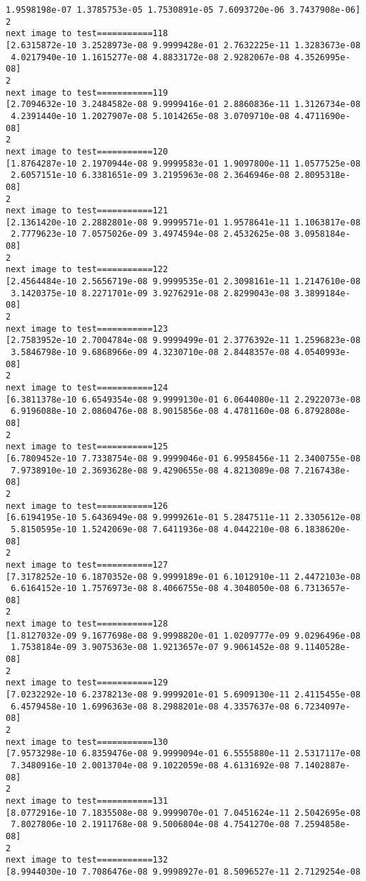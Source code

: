 \documentclass[11pt]{article}
\begin{document}
\begin{Verbatim}[commandchars=\\\{\}]
 1.9598198e-07 1.3785753e-05 1.7530891e-05 7.6093720e-06 3.7437908e-06]
2
next image to test===========118
[2.6315872e-10 3.2528973e-08 9.9999428e-01 2.7632225e-11 1.3283673e-08
 4.0217940e-10 1.1615277e-08 4.8833172e-08 2.9282067e-08 4.3526995e-08]
2
next image to test===========119
[2.7094632e-10 3.2484582e-08 9.9999416e-01 2.8860836e-11 1.3126734e-08
 4.2391440e-10 1.2027907e-08 5.1014265e-08 3.0709710e-08 4.4711690e-08]
2
next image to test===========120
[1.8764287e-10 2.1970944e-08 9.9999583e-01 1.9097800e-11 1.0577525e-08
 2.6057151e-10 6.3381651e-09 3.2195963e-08 2.3646946e-08 2.8095318e-08]
2
next image to test===========121
[2.1361420e-10 2.2882801e-08 9.9999571e-01 1.9578641e-11 1.1063817e-08
 2.7779623e-10 7.0575026e-09 3.4974594e-08 2.4532625e-08 3.0958184e-08]
2
next image to test===========122
[2.4564484e-10 2.5656719e-08 9.9999535e-01 2.3098161e-11 1.2147610e-08
 3.1420375e-10 8.2271701e-09 3.9276291e-08 2.8299043e-08 3.3899184e-08]
2
next image to test===========123
[2.7583952e-10 2.7004784e-08 9.9999499e-01 2.3776392e-11 1.2596823e-08
 3.5846798e-10 9.6868966e-09 4.3230710e-08 2.8448357e-08 4.0540993e-08]
2
next image to test===========124
[6.3811378e-10 6.6549354e-08 9.9999130e-01 6.0644080e-11 2.2922073e-08
 6.9196088e-10 2.0860476e-08 8.9015856e-08 4.4781160e-08 6.8792808e-08]
2
next image to test===========125
[6.7809452e-10 7.7338754e-08 9.9999046e-01 6.9958456e-11 2.3400755e-08
 7.9738910e-10 2.3693628e-08 9.4290655e-08 4.8213089e-08 7.2167438e-08]
2
next image to test===========126
[6.6194195e-10 5.6436949e-08 9.9999261e-01 5.2847511e-11 2.3305612e-08
 5.8150595e-10 1.5242069e-08 7.6411936e-08 4.0442210e-08 6.1838620e-08]
2
next image to test===========127
[7.3178252e-10 6.1870352e-08 9.9999189e-01 6.1012910e-11 2.4472103e-08
 6.6164152e-10 1.7576973e-08 8.4066755e-08 4.3048050e-08 6.7313657e-08]
2
next image to test===========128
[1.8127032e-09 9.1677698e-08 9.9998820e-01 1.0209777e-09 9.0296496e-08
 1.7538184e-09 3.9075363e-08 1.9213657e-07 9.9061452e-08 9.1140528e-08]
2
next image to test===========129
[7.0232292e-10 6.2378213e-08 9.9999201e-01 5.6909130e-11 2.4115455e-08
 6.4579458e-10 1.6996363e-08 8.2988201e-08 4.3357637e-08 6.7234097e-08]
2
next image to test===========130
[7.9573298e-10 6.8359476e-08 9.9999094e-01 6.5555880e-11 2.5317117e-08
 7.3480916e-10 2.0013704e-08 9.1022059e-08 4.6131692e-08 7.1402887e-08]
2
next image to test===========131
[8.0772916e-10 7.1835508e-08 9.9999070e-01 7.0451624e-11 2.5042695e-08
 7.8027806e-10 2.1911768e-08 9.5006804e-08 4.7541270e-08 7.2594858e-08]
2
next image to test===========132
[8.9944030e-10 7.7086476e-08 9.9998927e-01 8.5096527e-11 2.7129254e-08

\end{Verbatim}
\end{document}
